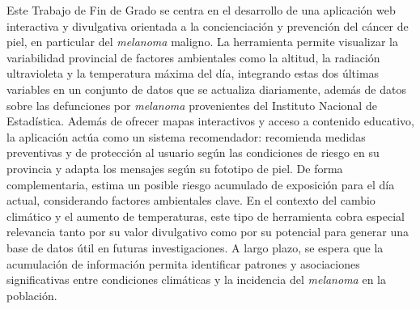 Este Trabajo de Fin de Grado se centra en el desarrollo de una aplicación web interactiva y divulgativa orientada a la concienciación y prevención del cáncer de piel, en particular del \textit{melanoma} maligno. La herramienta permite visualizar la variabilidad provincial de factores ambientales como la altitud, la radiación ultravioleta y  la temperatura máxima del día, integrando estas dos últimas variables en un conjunto de datos que se actualiza diariamente, además de datos sobre las defunciones por \textit{melanoma} provenientes del Instituto Nacional de Estadística. Además de ofrecer mapas interactivos y acceso a contenido educativo, la aplicación actúa como un sistema recomendador: recomienda medidas preventivas y de protección al usuario según las condiciones de riesgo en su provincia y adapta los mensajes según su fototipo de piel. De forma complementaria, estima un posible riesgo acumulado de exposición para el día actual, considerando factores ambientales clave. En el contexto del cambio climático y el aumento de temperaturas, este tipo de herramienta cobra especial relevancia tanto por su valor divulgativo como por su potencial para generar una base de datos útil en futuras investigaciones. A largo plazo, se espera que la acumulación de información permita identificar patrones y asociaciones significativas entre condiciones climáticas y la incidencia del \textit{melanoma} en la población.





